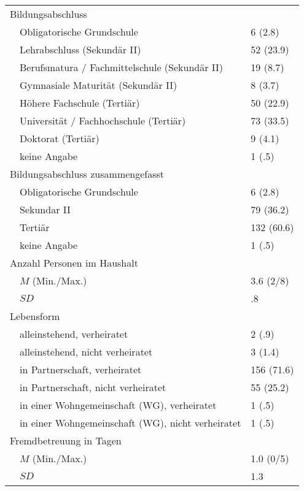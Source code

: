 \begin{center}
\begin{longtable}[l]{m{0.5em}  m{25em}  m{5em}}
  \multicolumn{2}{l}{Bildungsabschluss} \\
  & Obligatorische Grundschule & 6 (2.8)\\
  & Lehrabschluss (Sekundär II)& 52 (23.9)\\
  & Berufsmatura / Fachmittelschule (Sekundär II) & 19 (8.7)\\
  & Gymnasiale Maturität (Sekundär II) & 8 (3.7)\\
  & Höhere Fachschule (Tertiär) & 50 (22.9)\\
  & Universität / Fachhochschule (Tertiär) & 73 (33.5)\\
  & Doktorat (Tertiär) & 9 (4.1)\\
  & keine Angabe & 1 (.5)\\
  
  \multicolumn{2}{l}{Bildungsabschluss zusammengefasst} \\
  & Obligatorische Grundschule & 6 (2.8)\\
  & Sekundar II & 79 (36.2)\\
  & Tertiär & 132 (60.6)\\
  & keine Angabe & 1 (.5)\\
  
  \multicolumn{2}{l}{Anzahl Personen im Haushalt} \\
  &  $M$ (Min./Max.) & 3.6 (2/8)\\
  & $SD$ &  .8\\
  
  \multicolumn{2}{l}{Lebensform} \\
  & alleinstehend, verheiratet & 2 (.9)\\
  & alleinstehend, nicht verheiratet & 3 (1.4)\\
  & in Partnerschaft, verheiratet & 156 (71.6)\\
  & in Partnerschaft, nicht verheiratet & 55 (25.2)\\
  & in einer Wohngemeinschaft (WG), verheiratet & 1 (.5)\\
  & in einer Wohngemeinschaft (WG), nicht verheiratet & 1 (.5)\\
  
  \multicolumn{2}{l}{Fremdbetreuung in Tagen} \\
  &  $M$ (Min./Max.) & 1.0 (0/5)\\
  & $SD$ &  1.3\\
\end{longtable}
\end{center}
